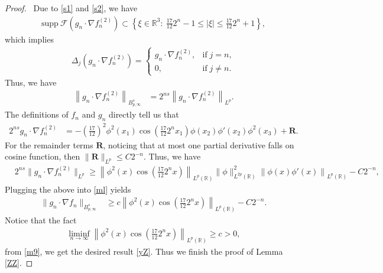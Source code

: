 \documentclass[12pt]{article}
\newcommand{\bal}{\begin{align}}
\newcommand{\bbal}{\begin{align*}}
\newcommand{\fr}{\frac}
\newcommand{\na}{\nabla}
\newcommand{\cd}{\cdot}
\newcommand{\R}{\mathbb{R}}
\newcommand{\f}{\left}
\newcommand{\g}{\right}
\begin{document}
\begin{proof}  \, Due to \eqref{s1} and \eqref{s2}, we have
\bbal
\mathrm{supp}\ \mathcal{F}\f(g_n\cd \na f_n^{(2)}\g)\subset \left\{\xi\in\R^3: \ \frac{17}{12}2^n-1\leq |\xi|\leq \frac{17}{12}2^n+1\right\},
\end{align*}
which implies
\begin{align*}
{\Delta_j\f(g_n\cd\na f_n^{(2)}\g)=}
\begin{cases}
g_n\cd \na f_n^{(2)}, &\text{if}\; j=n,\nonumber\\
0, &\text{if}\; j\neq n.\nonumber
\end{cases}
\end{align*}
Thus, we have
\bal\label{ml}
\f\|g_n\cd \na f_n^{(2)}\g\|_{B^s_{p,\infty}}&=2^{ns}\f\|g_n\cd \na f_n^{(2)}\g\|_{L^p}.
\end{align}
The definitions of $f_n$ and $g_n$ directly tell us that
\bbal
2^{ns}g_n\cd \na f_n^{(2)}&=-\left(\frac{17}{12}\right)^2\phi^2(x_1)\cos \left(\frac{17}{12}2^nx_1\right)\phi(x_2)\phi'(x_2)\phi^2(x_3)+\mathbf{R}.
\end{align*}
For the remainder terms $\mathbf{R}$, noticing that at most one partial derivative falls on cosine function, then $\|\mathbf{R}\|_{L^p}\leq C2^{-n}$.
Thus, we have
\bbal
&2^{ns}\|g_n\cd \na f_n^{(2)}\|_{L^p}\geq \left\|\phi^2(x)\cos \left(\frac{17}{12}2^nx\right)\right\|_{L^p(\R)}\|\phi\|^{2}_{L^{2p}(\R)}\f\|\phi(x)\phi'(x)\g\|_{L^p(\R)}-C2^{-n},
\end{align*}
Plugging the above into \eqref{ml} yields
\bal\label{m9}
\|g_n\cd \na f_n\|_{B^s_{p,\infty}}&\geq c\left\|\phi^2(x)\cos \left(\frac{17}{12}2^nx\right)\right\|_{L^p(\R)}-C2^{-n}.
\end{align}
Notice that the fact
\begin{align*}
\liminf_{n\rightarrow \infty}\left\|\phi^2(x)\cos \left(\fr{17}{12}2^nx\right)\right\|_{L^p(\R)}\geq c>0,
\end{align*}
from \eqref{m9}, we get the desired result \eqref{yZ}. Thus we finish the proof of Lemma \ref{ZZ}.\end{proof}
\end{document}
